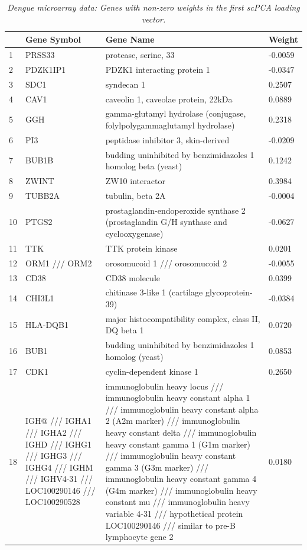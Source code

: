 \documentclass{article}
\begin{document}
\begin{longtable}{| l | p{4cm} | p{8cm} | l |}
  \caption{{\em Dengue microarray data: Genes with non-zero weights in the first scPCA loading vector.}}
  \label{tab:dengue_1} \\
  \hline
    & Gene Symbol & Gene Name & Weight \\ 
  \hline
  \endhead
  1 & PRSS33 & protease, serine, 33 & -0.0059 \\ 
  2 & PDZK1IP1 & PDZK1 interacting protein 1 & -0.0347 \\ 
  3 & SDC1 & syndecan 1 & 0.2507 \\ 
  4 & CAV1 & caveolin 1, caveolae protein, 22kDa & 0.0889 \\ 
  5 & GGH & gamma-glutamyl hydrolase (conjugase, folylpolygammaglutamyl hydrolase) & 0.2318 \\ 
  6 & PI3 & peptidase inhibitor 3, skin-derived & -0.0209 \\ 
  7 & BUB1B & budding uninhibited by benzimidazoles 1 homolog beta (yeast) & 0.1242 \\ 
  8 & ZWINT & ZW10 interactor & 0.3984 \\ 
  9 & TUBB2A & tubulin, beta 2A & -0.0004 \\ 
  10 & PTGS2 & prostaglandin-endoperoxide synthase 2 (prostaglandin G/H synthase and cyclooxygenase) & -0.0627 \\ 
  11 & TTK & TTK protein kinase & 0.0201 \\ 
  12 & ORM1 /// ORM2 & orosomucoid 1 /// orosomucoid 2 & -0.0055 \\ 
  13 & CD38 & CD38 molecule & 0.0399 \\ 
  14 & CHI3L1 & chitinase 3-like 1 (cartilage glycoprotein-39) & -0.0384 \\ 
  15 & HLA-DQB1 & major histocompatibility complex, class II, DQ beta 1 & 0.0720 \\ 
  16 & BUB1 & budding uninhibited by benzimidazoles 1 homolog (yeast) & 0.0853 \\ 
  17 & CDK1 & cyclin-dependent kinase 1 & 0.2650 \\ 
  18 & IGH@ /// IGHA1 /// IGHA2 /// IGHD /// IGHG1 /// IGHG3 /// IGHG4 /// IGHM /// IGHV4-31 /// LOC100290146 /// LOC100290528 & immunoglobulin heavy locus /// immunoglobulin heavy constant alpha 1 /// immunoglobulin heavy constant alpha 2 (A2m marker) /// immunoglobulin heavy constant delta /// immunoglobulin heavy constant gamma 1 (G1m marker) /// immunoglobulin heavy constant gamma 3 (G3m marker) /// immunoglobulin heavy constant gamma 4 (G4m marker) /// immunoglobulin heavy constant mu /// immunoglobulin heavy variable 4-31 /// hypothetical protein LOC100290146 /// similar to pre-B lymphocyte gene 2 & 0.0180 \\ 

\end{longtable}
\end{document}

